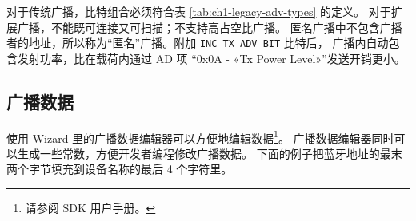 \documentclass[
  12pt,
]{book}
\begin{document}
对于传统广播，比特组合必须符合表 \ref{tab:ch1-legacy-adv-types} 的定义。
对于扩展广播，不能既可连接又可扫描；不支持高占空比广播。
匿名广播中不包含广播者的地址，所以称为``匿名''广播。附加 \texttt{INC\_TX\_ADV\_BIT} 比特后，
广播内自动包含发射功率，比在载荷内通过 AD 项 ``0x0A - «Tx Power Level»''发送开销更小。

\hypertarget{ch1-adv-data-edit}{%
\subsection{广播数据}\label{ch1-adv-data-edit}}

使用 Wizard 里的广播数据编辑器可以方便地编辑数据\footnote{请参阅 SDK 用户手册。}。
广播数据编辑器同时可以生成一些常数，方便开发者编程修改广播数据。
下面的例子把蓝牙地址的最末两个字节填充到设备名称的最后 4 个字符里。
\end{document}

